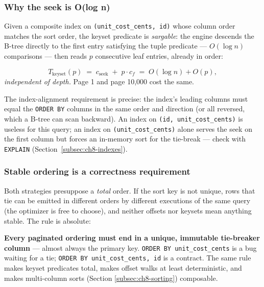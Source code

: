\subsubsection{Why the seek is O(log n)}

Given a composite index on \texttt{(unit\_cost\_cents, id)} whose column
order matches the sort order, the keyset predicate is \emph{sargable}: the
engine descends the B-tree directly to the first entry satisfying the tuple
predicate --- $O(\log n)$ comparisons --- then reads $p$ consecutive leaf
entries, already in order:

\begin{definition}
\[
T_{\mathrm{keyset}}(p) \;=\; c_{\mathrm{seek}} \;+\; p \cdot c_f
\;=\; O(\log n) + O(p),
\]
\emph{independent of depth.} Page 1 and page 10{,}000 cost the same.
\end{definition}

The index-alignment requirement is precise: the index's leading columns must
equal the \texttt{ORDER BY} columns in the same order and direction (or all
reversed, which a B-tree can scan backward). An index on
\texttt{(id, unit\_cost\_cents)} is useless for this query; an index on
\texttt{(unit\_cost\_cents)} alone serves the seek on the first column but
forces an in-memory sort for the tie-break --- check with
\texttt{EXPLAIN} (Section~\ref{subsec:ch8-indexes}).

\subsubsection{Stable ordering is a correctness requirement}

Both strategies presuppose a \emph{total} order. If the sort key is not
unique, rows that tie can be emitted in different orders by different
executions of the same query (the optimizer is free to choose), and neither
offsets nor keysets mean anything stable. The rule is absolute:

\begin{keyconceptbox}
\textbf{Every paginated ordering must end in a unique, immutable tie-breaker
column} --- almost always the primary key. \texttt{ORDER BY unit\_cost\_cents}
is a bug waiting for a tie; \texttt{ORDER BY unit\_cost\_cents, id} is a
contract. The same rule makes keyset predicates total, makes offset walks at
least deterministic, and makes multi-column sorts (Section
\ref{subsec:ch8-sorting}) composable.
\end{keyconceptbox}

